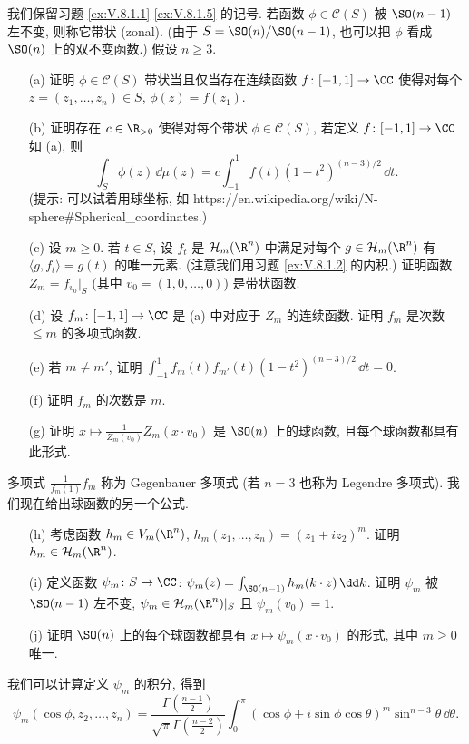 \begin{exercise}
\label{ex:V.8.1.6}
我们保留习题 \ref{ex:V.8.1.1}-\ref{ex:V.8.1.5} 的记号. 若函数 $\phi \in \mathcal{C}(S)$ 被 $\SO(n-1)$ 左不变, 则称它带状 (zonal). (由于 $S = \SO(n)/\SO(n-1)$, 也可以把 $\phi$ 看成 $\SO(n)$ 上的双不变函数.) 假设 $n \geq 3$.
\begin{enumerate}
\item[(a)] 证明 $\phi \in \mathcal{C}(S)$ 带状当且仅当存在连续函数 $f \colon [-1,1] \to \CC$ 使得对每个 $z = (z_1, \ldots, z_n) \in S$, $\phi(z) = f(z_1)$.
\item[(b)] 证明存在 $c \in \R_{>0}$ 使得对每个带状 $\phi \in \mathcal{C}(S)$, 若定义 $f \colon [-1,1] \to \CC$ 如 (a), 则
\[
\int_S\phi(z)\,\dd\mu(z) = c\int_{-1}^1 f(t)(1-t^2)^{(n-3)/2}\,\dd t.
\]
(提示: 可以试着用球坐标, 如 https://en.wikipedia.org/wiki/N-sphere\#Spherical\_coordinates.)
\item[(c)] 设 $m \geq 0$. 若 $t \in S$, 设 $f_t$ 是 $\mathcal{H}_m(\R^n)$ 中满足对每个 $g \in \mathcal{H}_m(\R^n)$ 有 $\langle g, f_t \rangle = g(t)$ 的唯一元素. (注意我们用习题 \ref{ex:V.8.1.2} 的内积.)
证明函数 $Z_m = f_{v_0}|_S$ (其中 $v_0 = (1, 0, \ldots, 0)$) 是带状函数.
\item[(d)] 设 $f_m \colon [-1,1] \to \CC$ 是 (a) 中对应于 $Z_m$ 的连续函数. 证明 $f_m$ 是次数 $\leq m$ 的多项式函数.
\item[(e)] 若 $m \neq m'$, 证明 $\int_{-1}^1 f_m(t)f_{m'}(t)(1-t^2)^{(n-3)/2}\,\dd t = 0$.
\item[(f)] 证明 $f_m$ 的次数是 $m$.
\item[(g)] 证明 $x \longmapsto \frac{1}{Z_m(v_0)}Z_m(x \cdot v_0)$ 是 $\SO(n)$ 上的球函数, 且每个球函数都具有此形式.
\end{enumerate}
多项式 $\frac{1}{f_m(1)}f_m$ 称为 Gegenbauer 多项式 (若 $n = 3$ 也称为 Legendre 多项式).
我们现在给出球函数的另一个公式.
\begin{enumerate}
\item[(h)] 考虑函数 $h_m \in V_m(\R^n)$, $h_m(z_1, \ldots, z_n) = (z_1 + iz_2)^m$. 证明 $h_m \in \mathcal{H}_m(\R^n)$.
\item[(i)] 定义函数 $\psi_m \colon S \to \CC$: $\psi_m(z) = \int_{\SO(n-1)}h_m(k \cdot z)\,\dd k$. 证明 $\psi_m$ 被 $\SO(n-1)$ 左不变, $\psi_m \in \mathcal{H}_m(\R^n)|_S$ 且 $\psi_m(v_0) = 1$.
\item[(j)] 证明 $\SO(n)$ 上的每个球函数都具有 $x \longmapsto \psi_m(x \cdot v_0)$ 的形式, 其中 $m \geq 0$ 唯一.
\end{enumerate}
我们可以计算定义 $\psi_m$ 的积分, 得到
\[
\psi_m(\cos\phi, z_2, \ldots, z_n) = \frac{\Gamma(\frac{n-1}{2})}{\sqrt{\pi}\Gamma(\frac{n-2}{2})}\int_0^{\pi}(\cos\phi + i\sin\phi\cos\theta)^m\sin^{n-3}\theta\,\dd\theta.
\]
\end{exercise}

